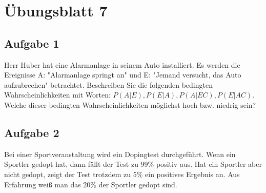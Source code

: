 \chapter{Übungsblatt 7}

\section{Aufgabe 1}

Herr Huber hat eine Alarmanlage in seinem Auto installiert. Es werden die Ereignisse A: "Alarmanlage springt an" und E: "Jemand versucht, das Auto aufzubrechen" betrachtet. Beschreiben Sie die folgenden bedingten Wahrscheinlichkeiten mit Worten: $P(A|E), P(E|A), P(A|EC), P(E|AC)$. Welche dieser bedingten Wahrscheinlichkeiten möglichst hoch bzw. niedrig sein?

\section{Aufgabe 2}

Bei einer Sportveranstaltung wird ein Dopingtest durchgeführt. Wenn ein Sportler gedopt hat, dann fällt der Test zu 99\% positiv aus. Hat ein Sportler aber nicht gedopt, zeigt der Test trotzdem zu 5\% ein positives Ergebnis an. Aus Erfahrung weiß man das 20\% der Sportler gedopt sind.